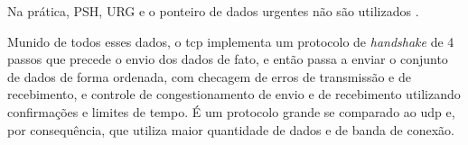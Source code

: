 Na prática, PSH, URG e o ponteiro de dados urgentes não são utilizados
\cite{book:kurose}.

Munido de todos esses dados, o \gls*{tcp} implementa um protocolo de \emph{handshake} de
4 passos que precede o envio dos dados de fato, e então passa a enviar o conjunto de
dados de forma ordenada, com checagem de erros de transmissão e de recebimento, e
controle de congestionamento de envio e de recebimento utilizando confirmações e
limites de tempo. É um protocolo grande se comparado ao \gls*{udp} e, por consequência,
que utiliza maior quantidade de dados e de banda de conexão.